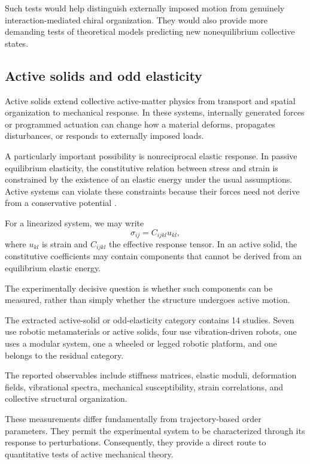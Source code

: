 Such tests would
help distinguish
externally imposed
motion from genuinely
interaction-mediated
chiral organization.
They would also
provide more demanding
tests of theoretical
models predicting
new nonequilibrium
collective states.

\subsection{Active solids and odd elasticity}
\label{sec:phenomena-active-solids}

Active solids extend collective active-matter
physics from transport and spatial organization
to mechanical response. In these systems,
internally generated forces or programmed
actuation can change how a material
deforms, propagates disturbances,
or responds to externally imposed
loads.

A particularly important possibility
is nonreciprocal elastic response.
In passive equilibrium elasticity,
the constitutive relation between
stress and strain is constrained
by the existence of an elastic
energy under the usual assumptions.
Active systems can violate these
constraints because their forces
need not derive from a conservative
potential
\cite{Scheibner2020odd}.

For a linearized system, we may write
\begin{equation}
\sigma_{ij}=C_{ijkl}u_{kl},
\label{eq:phenomena-active-elasticity}
\end{equation}
where $u_{kl}$ is strain and
$C_{ijkl}$ the effective
response tensor. In an
active solid, the
constitutive coefficients
may contain components
that cannot be derived
from an equilibrium
elastic energy.

The experimentally decisive
question is whether such
components can be measured,
rather than simply whether
the structure undergoes
active motion.

The extracted active-solid
or odd-elasticity category
contains 14 studies.
Seven use robotic metamaterials
or active solids, four use
vibration-driven robots,
one uses a modular system,
one a wheeled or legged
robotic platform, and
one belongs to the
residual category.

The reported observables
include stiffness matrices,
elastic moduli,
deformation fields,
vibrational spectra,
mechanical susceptibility,
strain correlations,
and collective
structural organization.

These measurements differ
fundamentally from
trajectory-based order
parameters. They permit
the experimental system
to be characterized
through its response
to perturbations.
Consequently, they
provide a direct route
to quantitative tests
of active mechanical
theory.

